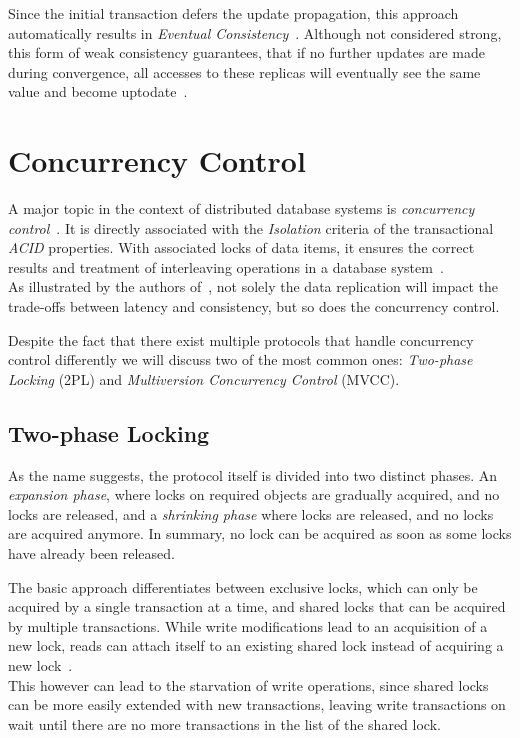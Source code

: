 Since the initial transaction defers the update propagation, this approach automatically results in \emph{Eventual Consistency}~\cite{shapiro:2011}.
Although not considered strong, this form of weak consistency guarantees, that if no further updates are made 
during convergence, all accesses to these replicas will eventually see the same value and become uptodate~\cite{quorums:2003}.




\section{Concurrency Control}
\label{sec:concurrency_control}

A major topic in the context of distributed database systems is \emph{concurrency control}~\cite{bernstein:1981}.
It is directly associated with the \emph{Isolation} criteria of the transactional \emph{ACID} properties.
With associated locks of data items, it ensures the correct results and treatment of interleaving operations in a database system~\cite{bernstein:1986}.
\\
As illustrated by the authors of~\cite{weikum:2001}, not solely the data replication will impact the trade-offs between latency and consistency,
but so does the concurrency control.

Despite the fact that there exist multiple protocols that handle concurrency control differently we will discuss two of the most common ones: 
\emph{Two-phase Locking} (2PL) and \emph{Multiversion Concurrency Control} (MVCC).




\subsection{Two-phase Locking}

As the name suggests, the protocol itself is divided into two distinct phases. An \emph{expansion phase}, where locks on required objects are gradually acquired, 
and no locks are released, and a \emph{shrinking phase} where locks are released, and no locks are acquired anymore.
In summary, no lock can be acquired as soon as some locks have already been released.

The basic approach differentiates between exclusive locks, which can only be acquired by a single transaction at a time, and shared locks that 
can be acquired by multiple transactions. While write modifications lead to an acquisition of a new lock, reads can attach itself to an existing shared lock 
instead of acquiring a new lock~\cite{mehrotra:1997}. \\
This however can lead to the starvation of write operations, since shared locks can be more easily extended with new transactions, leaving write transactions on wait until 
there are no more transactions in the list of the shared lock. 

